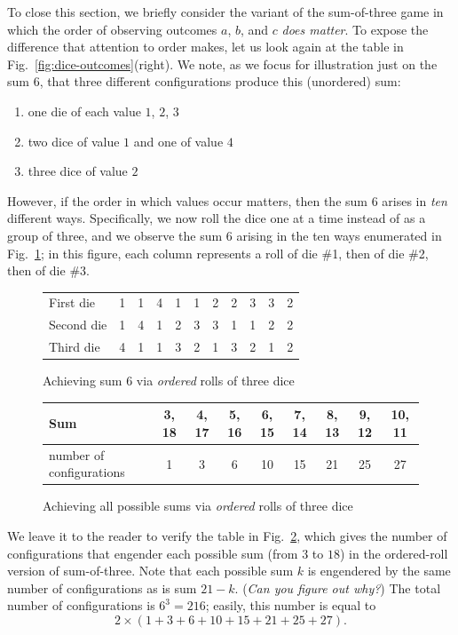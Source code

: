 \bigskip

To close this section, we briefly consider the variant of the sum-of-three game in which the order of observing outcomes $a$, $b$, and $c$ {\em does matter}.  To expose the difference that attention to order makes, let us look again at the table in Fig.~\ref{fig:dice-outcomes}(right).  We note, as we focus for illustration just on the sum $6$, that three different configurations produce this (unordered) sum:
\begin{enumerate}
\item one die of each value $1$, $2$, $3$
\item two dice of value $1$ and one of value $4$
\item three dice of value $2$
\end{enumerate}
However, if the order in which values occur matters, then the sum $6$ arises in {\em ten} different ways.  Specifically, we now roll the dice one at a time instead of as a group of three, and we observe the sum $6$ arising in the ten ways enumerated in
Fig.~\ref{fig:dice-ordered-outcomes}; in this figure, each column represents a roll of die \#1, then of die \#2, then of die \#3.
\begin{figure}[htb]
\begin{center}
\begin{tabular}{|l||c|c|c|c|c|c|c|c|c|c|}
\hline
First die & 1 & 1 & 4 & 1 & 1 & 2 & 2 & 3 & 3 & 2   \\

Second die & 1 & 4 & 1 & 2 & 3 & 3 & 1 & 1 & 2 & 2   \\

Third die & 4 & 1 & 1 & 3 & 2 & 1 & 3 & 2 & 1 & 2  \\
\hline
\end{tabular}
\end{center}
\caption{Achieving sum $6$ via {\em ordered} rolls of three dice}
\label{fig:dice-ordered-outcomes}
\end{figure}

\medskip

\begin{figure}[htb]
\begin{center}
\begin{tabular}{|l||c|c|c|c|c|c|c|c|}
\hline
Sum & 3, 18 & 4, 17 & 5, 16 & 6, 15 & 7, 14 & 8, 13 & 9, 12 & 10, 11  \\
\hline
number of configurations & 1 & 3 & 6 & 10 & 15 & 21 & 25 & 27  \\
\hline
\end{tabular}
\end{center}
\caption{Achieving all possible sums via {\em ordered} rolls of three dice}
\label{fig:dice-ordered-configs}
\end{figure}
We leave it to the reader to verify the table in Fig.~\ref{fig:dice-ordered-configs}, which gives the number of configurations that engender each possible sum (from $3$ to $18$) in the ordered-roll version of sum-of-three.  Note that each possible sum $k$ is engendered by the same number of configurations as is sum $21- k$.  ({\em Can you figure out why?})  The total number of configurations is $6^3 = 216$; easily, this number is equal to
\[ 2 \times (1 + 3 + 6 + 10 + 15 + 21 + 25 + 27). \]

